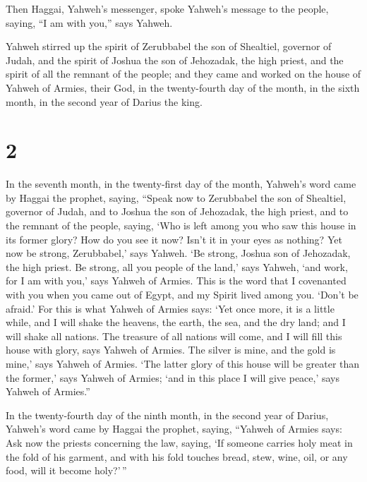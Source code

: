  Then Haggai, Yahweh's messenger, spoke Yahweh's message to
the people, saying, ``I am with you,'' says Yahweh.

 Yahweh stirred up the spirit of Zerubbabel the son of
Shealtiel, governor of Judah, and the spirit of Joshua the son of
Jehozadak, the high priest, and the spirit of all the remnant of the
people; and they came and worked on the house of Yahweh of Armies, their
God,  in the twenty-fourth day of the month, in the sixth
month, in the second year of Darius the king.

\hypertarget{section-1}{%
\section{2}\label{section-1}}

 In the seventh month, in the twenty-first day of the month,
Yahweh's word came by Haggai the prophet, saying,  ``Speak
now to Zerubbabel the son of Shealtiel, governor of Judah, and to Joshua
the son of Jehozadak, the high priest, and to the remnant of the people,
saying,  `Who is left among you who saw this house in its
former glory? How do you see it now? Isn't it in your eyes as nothing?
 Yet now be strong, Zerubbabel,' says Yahweh. `Be strong,
Joshua son of Jehozadak, the high priest. Be strong, all you people of
the land,' says Yahweh, `and work, for I am with you,' says Yahweh of
Armies.  This is the word that I covenanted with you when
you came out of Egypt, and my Spirit lived among you. `Don't be afraid.'
 For this is what Yahweh of Armies says: `Yet once more, it
is a little while, and I will shake the heavens, the earth, the sea, and
the dry land;  and I will shake all nations. The treasure of
all nations will come, and I will fill this house with glory, says
Yahweh of Armies.  The silver is mine, and the gold is
mine,' says Yahweh of Armies.  `The latter glory of this
house will be greater than the former,' says Yahweh of Armies; `and in
this place I will give peace,' says Yahweh of Armies.''

 In the twenty-fourth day of the ninth month, in the second
year of Darius, Yahweh's word came by Haggai the prophet, saying,
 ``Yahweh of Armies says: Ask now the priests concerning
the law, saying,  `If someone carries holy meat in the fold
of his garment, and with his fold touches bread, stew, wine, oil, or any
food, will it become holy?'\,''

